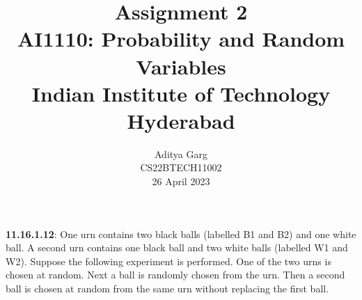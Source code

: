 \documentclass[journal,12pt,twocolumn]{IEEEtran}
\providecommand{\pr}[1]{\ensuremath{\Pr\left(#1\right)}}
\providecommand{\cbrak}[1]{\ensuremath{\left\{#1\right\}}}
\begin{document}
\newtheorem{theorem}{Theorem}[section]
\newtheorem{problem}{Problem}
\newtheorem{proposition}{Proposition}[section]
\newtheorem{lemma}{Lemma}[section]
\newtheorem{corollary}[theorem]{Corollary}
\newtheorem{example}{Example}[section]
\newtheorem{definition}[problem]{Definition}
\newcommand{\BEQA}{\begin{eqnarray}}
\newcommand{\EEQA}{\end{eqnarray}}
\newcommand{\define}{\stackrel{\triangle}{=}}



\providecommand{\mbf}{\mathbf}
\providecommand{\pr}[1]{\ensuremath{\Pr\left(#1\right)}}
\providecommand{\qfunc}[1]{\ensuremath{Q\left(#1\right)}}
\providecommand{\sbrak}[1]{\ensuremath{{}\left[#1\right]}}
\providecommand{\lsbrak}[1]{\ensuremath{{}\left[#1\right.}}
\providecommand{\rsbrak}[1]{\ensuremath{{}\left.#1\right]}}
\providecommand{\brak}[1]{\ensuremath{\left(#1\right)}}
\providecommand{\lbrak}[1]{\ensuremath{\left(#1\right.}}
\providecommand{\rbrak}[1]{\ensuremath{\left.#1\right)}}
\providecommand{\cbrak}[1]{\ensuremath{\left\{#1\right\}}}
\providecommand{\lcbrak}[1]{\ensuremath{\left\{#1\right.}}
\providecommand{\rcbrak}[1]{\ensuremath{\left.#1\right\}}}
\theoremstyle{remark}
\newtheorem{rem}{Remark}
\newcommand{\sgn}{\mathop{\mathrm{sgn}}}

\newcommand{\solution}{\noindent \textbf{Solution: }}
\newcommand{\cosec}{\,\text{cosec}\,}
\providecommand{\dec}[2]{\ensuremath{\overset{#1}{\underset{#2}{\gtrless}}}}
\newcommand{\myvec}[1]{\ensuremath{\begin{pmatrix}#1\end{pmatrix}}}
\newcommand{\mydet}[1]{\ensuremath{\begin{vmatrix}#1\end{vmatrix}}}

\let\vec\mathbf


\vspace{3cm}

\title{
   Assignment 2\\ \Large AI1110: Probability and Random Variables \\ \large Indian Institute of Technology Hyderabad
}
\author{ Aditya Garg \\ CS22BTECH11002 \\ 26 April 2023	
	
}	
\maketitle
\newpage
\bigskip
\renewcommand{\thefigure}{\theenumi}
\renewcommand{\thetable}{\theenumi}
\renewcommand{\thetable}{\arabic{table}}  
\textbf{11.16.1.12}:
One urn contains two black balls (labelled B1 and B2) and one white ball. A
second urn contains one black ball and two white balls (labelled W1 and W2).
Suppose the following experiment is performed. One of the two urns is chosen
at random. Next a ball is randomly chosen from the urn. Then a second ball is
chosen at random from the same urn without replacing the first ball.
\end{document}
